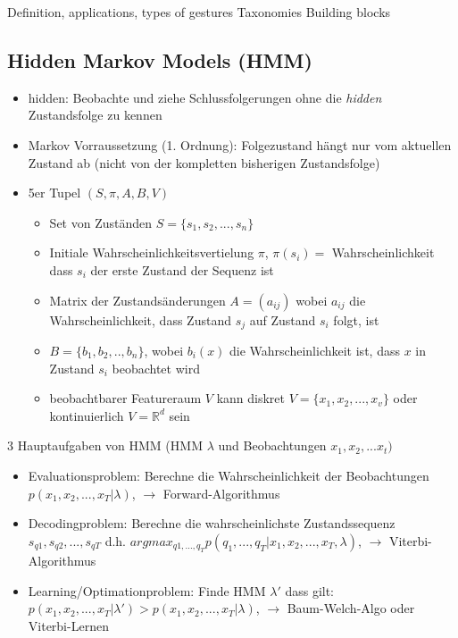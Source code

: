 \documentclass[paper=a4, fontsize=11pt]{scrartcl} %
\numberwithin{equation}{section} %
\numberwithin{figure}{section} %
\numberwithin{table}{section} %
\begin{document}
Definition, applications, types of gestures Taxonomies
Building blocks

\subsection{Hidden Markov Models (HMM)}

\begin{itemize}
\item \glqq hidden\grqq: Beobachte und ziehe Schlussfolgerungen ohne die \textit{hidden} Zustandsfolge zu kennen
\item Markov Vorraussetzung (1. Ordnung): Folgezustand hängt nur vom aktuellen Zustand ab (nicht von der kompletten bisherigen Zustandsfolge)
\item 5er Tupel $(S,\pi,A,B,V)$
\begin{itemize}
\item Set von Zuständen $S = \{s_1,s_2,...,s_n\}$
\item Initiale Wahrscheinlichkeitsvertielung $\pi$, $\pi(s_i) =$ Wahrscheinlichkeit dass $s_i$ der erste Zustand der Sequenz ist
\item Matrix der Zustandsänderungen $A = (a_{ij})$ wobei $a_{ij}$ die Wahrscheinlichkeit, dass Zustand $s_j$ auf Zustand $s_i$ folgt, ist
\item $B=\{b_1,b_2,..,b_n\}$, wobei $b_i(x)$ die Wahrscheinlichkeit ist, dass $x$ in Zustand $s_i$ beobachtet wird
\item beobachtbarer Featureraum $V$ kann diskret $V=\{x_1,x_2,...,x_v\}$ oder kontinuierlich $V = \mathbb{R}^d$ sein
\end{itemize}
\end{itemize}

3 Hauptaufgaben von HMM (HMM $\lambda$ und Beobachtungen $x_1,x_2,...x_t)$
\begin{itemize}
\item Evaluationsproblem: Berechne die Wahrscheinlichkeit der Beobachtungen $p(x_1,x_2,...,x_T|\lambda)$, $\rightarrow$ Forward-Algorithmus
\item Decodingproblem: Berechne die wahrscheinlichste Zustandssequenz $s_{q1},s_{q2},...,s_{qT}$ d.h. $argmax_{q1,...,q_T} p(q_1,...,q_T|x_1,x_2,...,x_T,\lambda)$, $\rightarrow$ Viterbi-Algorithmus
\item Learning/Optimationproblem: Finde HMM $\lambda'$ dass gilt: $p(x_1,x_2,...,x_T|\lambda') > p(x_1,x_2,...,x_T|\lambda)$, $\rightarrow$ Baum-Welch-Algo oder Viterbi-Lernen 
\end{itemize}
\end{document}
